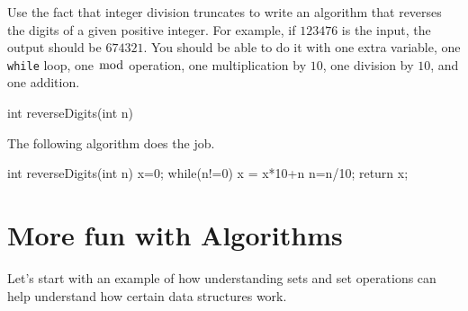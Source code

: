 \newpage

\begin{exer}
Use the fact that integer division truncates to write 
an algorithm that reverses the digits of a given positive integer. 
For example, if $123476$ is the input, the output should
be $674321$. 
You should be able to do it with one extra variable,
one {\tt while} loop, one $\bmod$ operation,
one multiplication by $10$, one division by $10$, and one addition.
\begin{code}
    int reverseDigits(int n) {











    }
\end{code}
\begin{answer} 
The following algorithm does the job.
\begin{code}
	int reverseDigits(int n) {
		x=0;
		while(n!=0) {
		    x = x*10+n%
		    n=n/10;
		}
		return x;
	}
\end{code}
\end{answer}
\end{exer}

\newpage
\section{More fun with Algorithms}\label{section:funAlgs}

Let's start with an example of how understanding sets and
set operations can help understand how certain data structures
work.

